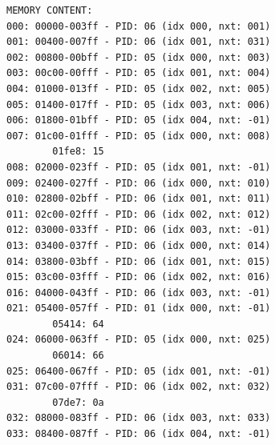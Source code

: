 \documentclass[a4paper]{article}
\numberwithin{equation}{section}
\begin{document}
\begin{mdframed}[leftline=false,rightline=false,backgroundcolor=grey!10,nobreak=false]
\begin{verbatim}
MEMORY CONTENT: 
000: 00000-003ff - PID: 06 (idx 000, nxt: 001)
001: 00400-007ff - PID: 06 (idx 001, nxt: 031)
002: 00800-00bff - PID: 05 (idx 000, nxt: 003)
003: 00c00-00fff - PID: 05 (idx 001, nxt: 004)
004: 01000-013ff - PID: 05 (idx 002, nxt: 005)
005: 01400-017ff - PID: 05 (idx 003, nxt: 006)
006: 01800-01bff - PID: 05 (idx 004, nxt: -01)
007: 01c00-01fff - PID: 05 (idx 000, nxt: 008)
        01fe8: 15
008: 02000-023ff - PID: 05 (idx 001, nxt: -01)
009: 02400-027ff - PID: 06 (idx 000, nxt: 010)
010: 02800-02bff - PID: 06 (idx 001, nxt: 011)
011: 02c00-02fff - PID: 06 (idx 002, nxt: 012)
012: 03000-033ff - PID: 06 (idx 003, nxt: -01)
013: 03400-037ff - PID: 06 (idx 000, nxt: 014)
014: 03800-03bff - PID: 06 (idx 001, nxt: 015)
015: 03c00-03fff - PID: 06 (idx 002, nxt: 016)
016: 04000-043ff - PID: 06 (idx 003, nxt: -01)
021: 05400-057ff - PID: 01 (idx 000, nxt: -01)
        05414: 64
024: 06000-063ff - PID: 05 (idx 000, nxt: 025)
        06014: 66
025: 06400-067ff - PID: 05 (idx 001, nxt: -01)
031: 07c00-07fff - PID: 06 (idx 002, nxt: 032)
        07de7: 0a
032: 08000-083ff - PID: 06 (idx 003, nxt: 033)
033: 08400-087ff - PID: 06 (idx 004, nxt: -01)
  \end{verbatim}
\end{mdframed}
\end{document}
